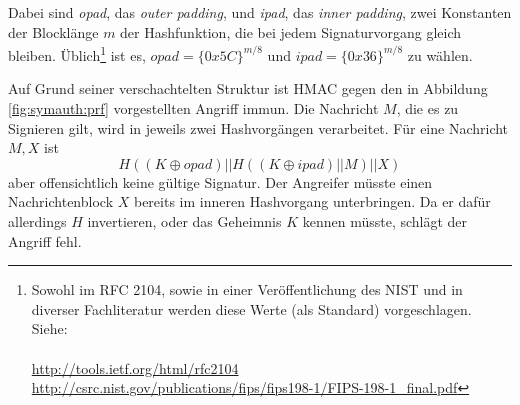 Dabei sind \textit{opad}, das \textit{outer padding}, und \textit{ipad},
das \textit{inner padding}, zwei Konstanten der Blocklänge $m$ der
Hashfunktion, die bei jedem Signaturvorgang gleich
bleiben. Üblich\footnote{Sowohl im RFC 2104, sowie in einer
  Veröffentlichung des NIST und in diverser Fachliteratur werden diese
  Werte (als Standard) vorgeschlagen. Siehe: ~\\~\\
  \url{http://tools.ietf.org/html/rfc2104} \\
  \url{http://csrc.nist.gov/publications/fips/fips198-1/FIPS-198-1_final.pdf}}
ist es, $opad = \{0x5C\}^{m/8}$ und $ipad = \{0x36\}^{m/8}$ zu wählen.

Auf Grund seiner verschachtelten Struktur ist HMAC gegen den in
Abbildung \ref{fig:symauth:prf} vorgestellten Angriff immun.  Die
Nachricht $M$, die es zu Signieren gilt, wird in jeweils zwei
Hash\-vorgängen verarbeitet. Für eine Nachricht $M,X$ ist
\begin{equation*} H((K \oplus \textit{opad})|| H((K \oplus
  \textit{ipad})|| M)|| X)
\end{equation*} aber offensichtlich keine gültige Signatur. Der
Angreifer müsste einen Nachrichtenblock $X$ bereits im inneren
Hashvorgang unterbringen. Da er dafür allerdings $H$ invertieren, oder
das Geheimnis $K$ kennen müsste, schlägt der Angriff fehl.
